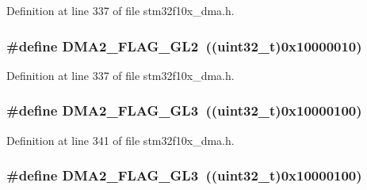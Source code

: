 Definition at line 337 of file stm32f10x\+\_\+dma.\+h.

\subsubsection[{\texorpdfstring{D\+M\+A2\+\_\+\+F\+L\+A\+G\+\_\+\+G\+L2}{DMA2_FLAG_GL2}}]{\setlength{\rightskip}{0pt plus 5cm}\#define D\+M\+A2\+\_\+\+F\+L\+A\+G\+\_\+\+G\+L2~(({\bf uint32\+\_\+t})0x10000010)}\hypertarget{group___d_m_a__flags__definition_gaa646f1ffc4468931a748ecff6440d40f}{}\label{group___d_m_a__flags__definition_gaa646f1ffc4468931a748ecff6440d40f}


Definition at line 337 of file stm32f10x\+\_\+dma.\+h.

\subsubsection[{\texorpdfstring{D\+M\+A2\+\_\+\+F\+L\+A\+G\+\_\+\+G\+L3}{DMA2_FLAG_GL3}}]{\setlength{\rightskip}{0pt plus 5cm}\#define D\+M\+A2\+\_\+\+F\+L\+A\+G\+\_\+\+G\+L3~(({\bf uint32\+\_\+t})0x10000100)}\hypertarget{group___d_m_a__flags__definition_ga4c56bb0c92db51e9147b122f2dff1c0a}{}\label{group___d_m_a__flags__definition_ga4c56bb0c92db51e9147b122f2dff1c0a}


Definition at line 341 of file stm32f10x\+\_\+dma.\+h.

\subsubsection[{\texorpdfstring{D\+M\+A2\+\_\+\+F\+L\+A\+G\+\_\+\+G\+L3}{DMA2_FLAG_GL3}}]{\setlength{\rightskip}{0pt plus 5cm}\#define D\+M\+A2\+\_\+\+F\+L\+A\+G\+\_\+\+G\+L3~(({\bf uint32\+\_\+t})0x10000100)}\hypertarget{group___d_m_a__flags__definition_ga4c56bb0c92db51e9147b122f2dff1c0a}{}\label{group___d_m_a__flags__definition_ga4c56bb0c92db51e9147b122f2dff1c0a}


